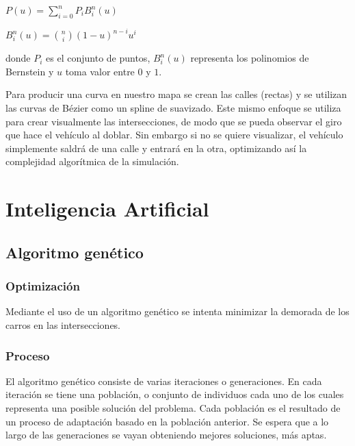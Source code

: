 \documentclass[colorinlistoftodos,twoside,twocolumn]{article} %
\begin{document}
	\begin{center}
		$ P(u) = \sum_{i=0}^{n} P_{i}B_{i}^{n}(u) $
	\end{center}
	\begin{center}
		$ B_{i}^{n}(u) = \binom{n}{i} (1 - u)^{n-i}u^{i} $
	\end{center}
	donde $ P_{i} $ es el conjunto de puntos, $ B_{i}^{n}(u) $ representa los polinomios de Bernstein y $ u $ toma valor entre $ 0 $ y $ 1 $.

	Para producir una curva en nuestro mapa se crean las calles (rectas) y se utilizan las curvas de B\'ezier como un spline de suavizado. Este mismo enfoque se utiliza para crear visualmente las intersecciones, de modo que se pueda observar el giro que hace el veh\'iculo al doblar. Sin embargo si no se quiere visualizar, el veh\'iculo simplemente saldr\'a de una calle y entrar\'a en la otra, optimizando as\'i la complejidad algor\'itmica de la simulaci\'on.
	
	
	\section{Inteligencia Artificial}
	
	\subsection{Algoritmo genético}
	
	\subsubsection{Optimizaci\'on}
	
	Mediante el uso de un algoritmo gen\'etico se intenta minimizar la demorada de los carros en las intersecciones. 
	
	\subsubsection{Proceso}
	
	El algoritmo gen\'etico consiste de varias iteraciones o generaciones. En cada iteraci\'on se tiene una poblaci\'on, o conjunto de individuos cada uno de los cuales representa una posible soluci\'on del problema. Cada poblaci\'on es el resultado de un proceso de adaptaci\'on basado en la poblaci\'on anterior. Se espera que a lo largo de las generaciones se vayan obteniendo mejores soluciones, m\'as aptas.
	
\end{document}

